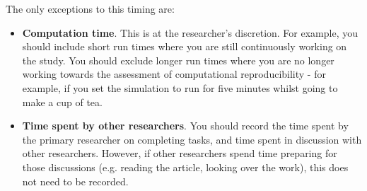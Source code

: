 The only exceptions to this timing are:
\begin{itemize}
    \item \textbf{Computation time}. This is at the researcher's discretion. For example, you should include short run times where you are still continuously working on the study. You should exclude longer run times where you are no longer working towards the assessment of computational reproducibility - for example, if you set the simulation to run for five minutes whilst going to make a cup of tea.
    \item \textbf{Time spent by other researchers}. You should record the time spent by the primary researcher on completing tasks, and time spent in discussion with other researchers. However, if other researchers spend time preparing for those discussions (e.g. reading the article, looking over the work), this does not need to be recorded.
\end{itemize}